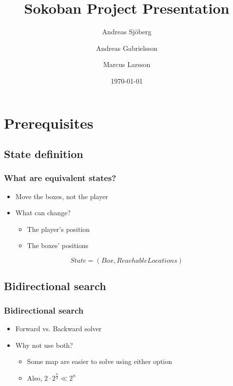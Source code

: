 \documentclass[]{beamer}
\title{Sokoban Project Presentation}    %
\author{Andreas Sjöberg \and Andreas Gabrielsson \and Marcus Larsson}                 %
\institute{The Predicates \\ KTH}      %
\date{\today}                    %
\begin{document}
\begin{frame}
  \titlepage
\end{frame}

\section[Outline]{}

\begin{frame}
  \tableofcontents
\end{frame}

\section{Prerequisites}

\subsection{State definition}
\begin{frame}
	\frametitle{What are equivalent states?}
	\begin{itemize}
		\item{Move the boxes, not the player}
		\item{What can change?
			\pause
			\begin{itemize}
				\item{The player's position}
				\item{The boxes' positions}
			\end{itemize}
		}
	\end{itemize}
	\pause
	$$State = (Box, ReachableLocations) $$ 
\end{frame}

\subsection{Bidirectional search}
\begin{frame}
	\frametitle{Bidirectional search}
	\begin{itemize}
		\item{Forward vs. Backward solver}
		\pause
		\item{Why not use both?
			\begin{itemize}
				\item{Some map are easier to solve using either option}
				\item{Also, $2 \cdot 2^\frac{n}{2} \ll 2^n$}
			\end{itemize}
		}
	\end{itemize}
\end{frame}
\end{document}
